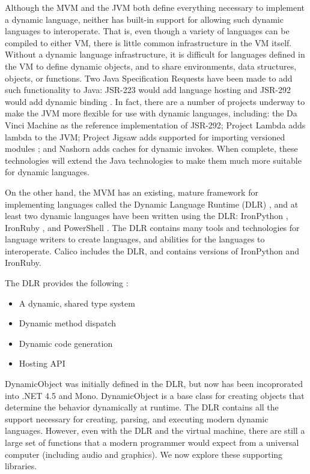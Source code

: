 \documentclass[preprint]{sigplanconf}
\begin{document}
Although the MVM and the JVM both define everything necessary to
implement a dynamic language, neither has built-in support for
allowing such dynamic languages to interoperate. That is, even though
a variety of languages can be compiled to either VM, there is little
common infrastructure in the VM itself. Without a dynamic language
infrastructure, it is difficult for languages defined in the VM to
define dynamic objects, and to share environments, data structures,
objects, or functions. Two Java Specification Requests have been made
to add such functionality to Java: JSR-223 would add language hosting
and JSR-292 would add dynamic binding \cite{wu-2010}. In fact, there are a
number of projects underway to make the JVM more flexible for use with
dynamic languages, including: the Da Vinci Machine \cite{java-davinci}
as the reference implementation of JSR-292; Project Lambda
\cite{java-lambda} adds lambda to the JVM; Project Jigsaw adds
supported for importing versioned modules \cite{java-jigsaw}; and
Nashorn \cite{java-nashorn} adds caches for dynamic invokes. When
complete, these technologies will extend the Java technologies to make
them much more suitable for dynamic languages.

On the other hand, the MVM has an existing, mature framework for
implementing languages called the Dynamic Language Runtime (DLR)
\cite{dynamic-language-runtime}, and at least two dynamic languages
have been written using the DLR: IronPython \cite{ironpython},
IronRuby \cite{ironruby}, and PowerShell \cite{powershell}. The DLR
contains many tools and technologies for language writers to create
languages, and abilities for the languages to interoperate. Calico
includes the DLR, and contains versions of IronPython and IronRuby.

The DLR provides the following \cite{dlr-wikipedia}:
\begin{itemize}
\item A dynamic, shared type system 
\item Dynamic method dispatch
\item Dynamic code generation
\item Hosting API
\end{itemize}

DynamicObject was initially defined in the DLR, but now has been
incoprorated into .NET 4.5 and Mono. DynamicObject is a base class for
creating objects that determine the behavior dynamically at
runtime. The DLR contains all the support necessary for creating,
parsing, and executing modern dynamic languages. However, even with
the DLR and the virtual machine, there are still a large set of
functions that a modern programmer would expect from a universal
computer (including audio and graphics). We now explore these
supporting libraries.
\end{document}
